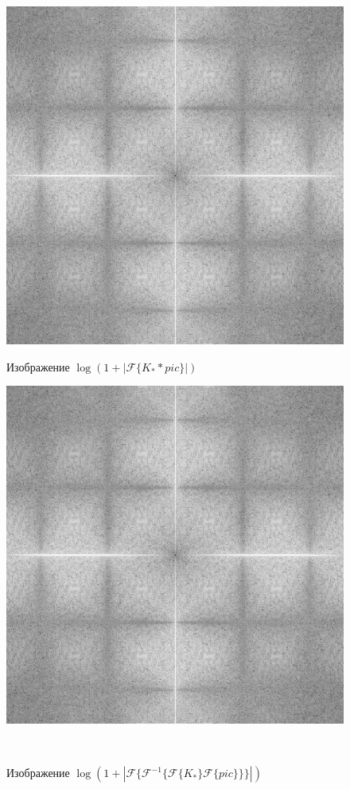 \documentclass[a4paper]{article}
\begin{document}
\begin{figure}[H]
    \begin{minipage}{0.49\textwidth}
        \centering \includegraphics[width=\textwidth]{2/abs_fourier_log_norm_img_edge.png}
        \caption{Изображение $\log{(1+|\mathcal{F}\{K_**pic\}|)}$}
    \end{minipage}\hfill
    \begin{minipage}{0.49\textwidth}
        \centering \includegraphics[width=\textwidth]{2/abs_fourier_log_norm_img_edge1.png}
        \caption{Изображение $\log{(1+|\mathcal{F}\{\mathcal{F}^{-1}\{ \mathcal{F}\{K_*\}\mathcal{F}\{pic\}\}\}|)}$}
    \end{minipage}\\[1em]
\end{figure}\noindent\
\end{document}
